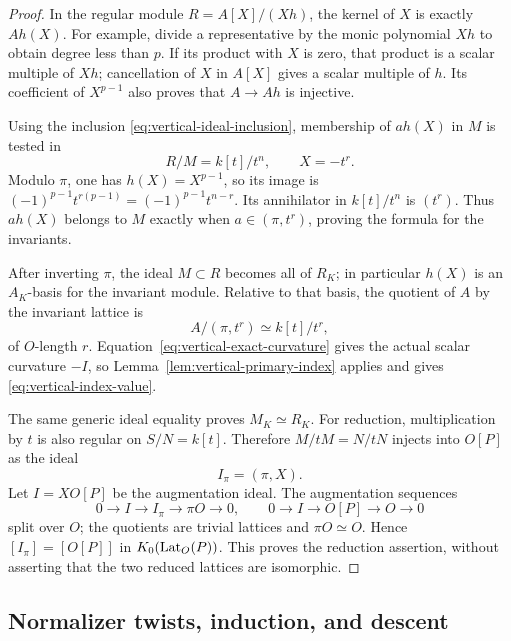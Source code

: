 \begin{proof}
In the regular module \(R=A[X]/(Xh)\), the kernel of \(X\)
is exactly \(Ah(X)\).  For example, divide a representative
by the monic polynomial \(Xh\) to obtain degree less than \(p\).
If its product with \(X\) is zero, that product is a scalar
multiple of \(Xh\); cancellation of \(X\) in \(A[X]\) gives
a scalar multiple of \(h\).  Its coefficient of \(X^{p-1}\)
also proves that \(A\to Ah\) is injective.

Using the inclusion \eqref{eq:vertical-ideal-inclusion},
membership of \(a h(X)\) in \(M\) is tested in
\[
 R/M=k[t]/t^n,\qquad X=-t^r.
\]
Modulo \(\pi\), one has \(h(X)=X^{p-1}\), so its image is
\((-1)^{p-1}t^{r(p-1)}=(-1)^{p-1}t^{n-r}\).
Its annihilator in \(k[t]/t^n\) is \((t^r)\).
Thus \(a h(X)\) belongs to \(M\) exactly when
\(a\in(\pi,t^r)\), proving the formula for the invariants.

After inverting \(\pi\), the ideal \(M\subset R\) becomes all
of \(R_K\); in particular \(h(X)\) is an \(A_K\)-basis for the
invariant module.  Relative to that basis, the quotient of
\(A\) by the invariant lattice is
\[
 A/(\pi,t^r)\simeq k[t]/t^r,
\]
of \(O\)-length \(r\).
Equation~\eqref{eq:vertical-exact-curvature} gives the actual
scalar curvature \(-I\), so
Lemma~\ref{lem:vertical-primary-index} applies and gives
\eqref{eq:vertical-index-value}.

The same generic ideal equality proves \(M_K\simeq R_K\).
For reduction, multiplication by \(t\) is also regular on
\(S/N=k[t]\).  Therefore \(M/tM=N/tN\) injects into
\(O[P]\) as the ideal
\[
 I_\pi=(\pi,X).
\]
Let \(I=XO[P]\) be the augmentation ideal.
The augmentation sequences
\[
 0\longrightarrow I\longrightarrow I_\pi
        \longrightarrow \pi O\longrightarrow0,\qquad
 0\longrightarrow I\longrightarrow O[P]
        \longrightarrow O\longrightarrow0
\]
split over \(O\); the quotients are trivial lattices and
\(\pi O\simeq O\).
Hence \([I_\pi]=[O[P]]\) in \(K_0(\operatorname{Lat}_O(P))\).
This proves the reduction assertion, without asserting that
the two reduced lattices are isomorphic.
\end{proof}

\subsection{Normalizer twists, induction, and descent}

